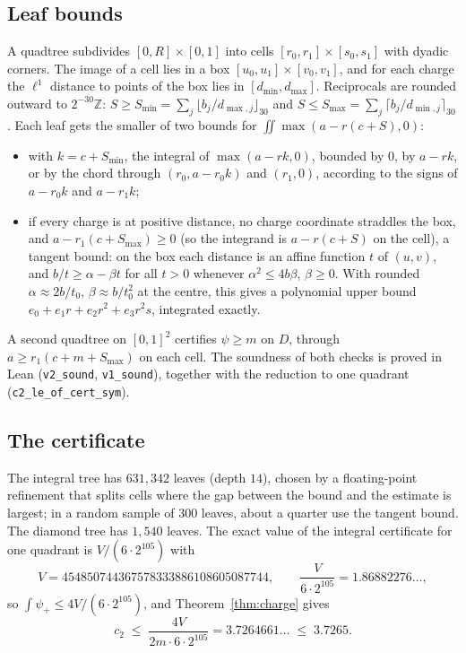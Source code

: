 \documentclass[11pt]{amsart}
\theoremstyle{definition}
\theoremstyle{remark}
\newcommand{\Z}{\mathbb{Z}}
\newcommand{\lean}[1]{\texttt{#1}}
\begin{document}
\subsection*{Leaf bounds}
A quadtree subdivides $[0, R] \times [0, 1]$ into cells $[r_0, r_1] \times [s_0, s_1]$ with dyadic corners.
The image of a cell lies in a box $[u_0,u_1] \times [v_0,v_1]$, and for each charge the $\ell^1$
distance to points of the box lies in $[d_{\min}, d_{\max}]$. Reciprocals are rounded outward to
$2^{-30}\Z$: $S \ge S_{\min} = \sum_j \lfloor b_j/d_{\max,j} \rfloor_{30}$ and
$S \le S_{\max} = \sum_j \lceil b_j/d_{\min,j} \rceil_{30}$. Each leaf gets the smaller of two bounds for
$\iint \max(a - r(c+S), 0)$:
\begin{itemize}[leftmargin=2em]
\item[$J_1$:] with $k = c + S_{\min}$, the integral of $\max(a - rk, 0)$, bounded by $0$, by $a - rk$, or by
  the chord through $(r_0, a - r_0k)$ and $(r_1, 0)$, according to the signs of $a - r_0 k$ and $a - r_1 k$;
\item[$J_2$:] if every charge is at positive distance, no charge coordinate straddles the box, and
  $a - r_1(c + S_{\max}) \ge 0$ (so the integrand is $a - r(c+S)$ on the cell), a tangent bound: on the box
  each distance is an affine function $t$ of $(u,v)$, and $b/t \ge \alpha - \beta t$ for all $t>0$ whenever
  $\alpha^2 \le 4b\beta$, $\beta \ge 0$. With rounded $\alpha \approx 2b/t_0$, $\beta \approx b/t_0^2$ at the
  centre, this gives a polynomial upper bound $e_0 + e_1 r + e_2 r^2 + e_3 r^2 s$, integrated exactly.
\end{itemize}
A second quadtree on $[0,1]^2$ certifies $\psi \ge m$ on $D$, through $a \ge r_1(c + m + S_{\max})$ on each
cell. The soundness of both checks is proved in Lean (\lean{v2\_sound}, \lean{v1\_sound}), together with
the reduction to one quadrant (\lean{c2\_le\_of\_cert\_sym}).

\subsection*{The certificate}
The integral tree has $631{,}342$ leaves (depth $14$), chosen by a floating-point refinement
that splits cells where the gap between the bound and the estimate is largest; in a random sample of
$300$ leaves, about a quarter use the tangent bound. The diamond tree has $1{,}540$ leaves. The exact value of the integral certificate for
one quadrant is $V/(6 \cdot 2^{105})$ with
\[ V = 454850744367578333886108605087744, \qquad \frac{V}{6\cdot 2^{105}} = 1.86882276\ldots, \]
so $\int\psi_+ \le 4V/(6\cdot2^{105})$, and Theorem~\ref{thm:charge} gives
\[ c_2 \;\le\; \frac{4V}{2m \cdot 6 \cdot 2^{105}} = 3.7264661\ldots \;\le\; 3.7265 . \]
\end{document}
